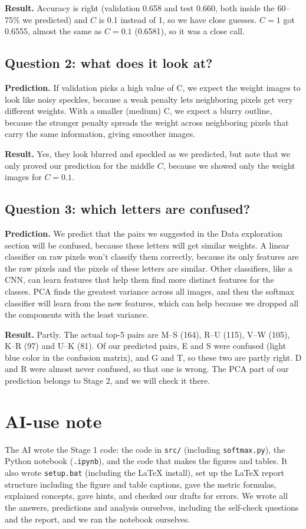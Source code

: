 \textbf{Result.} Accuracy is right (validation 0.658 and test 0.660, both inside the 60--75\% we predicted) and $C$ is 0.1 instead of 1, so we have close guesses. $C=1$ got 0.6555, almost the same as $C=0.1$ (0.6581), so it was a close call.

\subsection{Question 2: what does it look at?}

\textbf{Prediction.} If validation picks a high value of C, we expect the weight images to look like noisy speckles, because a weak penalty lets neighboring pixels get very different weights. With a smaller (medium) C, we expect a blurry outline, because the stronger penalty spreads the weight across neighboring pixels that carry the same information, giving smoother images.

\textbf{Result.} Yes, they look blurred and speckled as we predicted, but note that we only proved our prediction for the middle $C$, because we showed only the weight images for $C=0.1$.

\subsection{Question 3: which letters are confused?}

\textbf{Prediction.} We predict that the pairs we suggested in the Data exploration section will be confused, because these letters will get similar weights. A linear classifier on raw pixels won't classify them correctly, because its only features are the raw pixels and the pixels of these letters are similar. Other classifiers, like a CNN, can learn features that help them find more distinct features for the classes. PCA finds the greatest variance across all images, and then the softmax classifier will learn from the new features, which can help because we dropped all the components with the least variance.

\textbf{Result.} Partly. The actual top-5 pairs are M--S (164), R--U (115), V--W (105), K--R (97) and U--K (81). Of our predicted pairs, E and S were confused (light blue color in the confusion matrix), and G and T, so these two are partly right. D and R were almost never confused, so that one is wrong. The PCA part of our prediction belongs to Stage 2, and we will check it there.

\section{AI-use note}

The AI wrote the Stage 1 code: the code in \texttt{src/} (including \texttt{softmax.py}), the Python notebook (\texttt{.ipynb}), and the code that makes the figures and tables. It also wrote \texttt{setup.bat} (including the LaTeX install), set up the LaTeX report structure including the figure and table captions, gave the metric formulas, explained concepts, gave hints, and checked our drafts for errors. We wrote all the answers, predictions and analysis ourselves, including the self-check questions and the report, and we ran the notebook ourselves.
